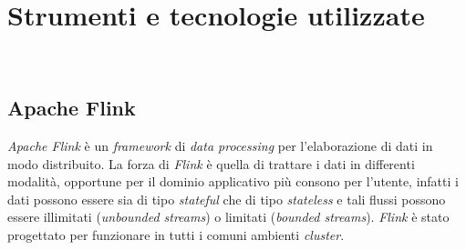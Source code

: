 
\chapter{Strumenti e tecnologie utilizzate}
\label{cap:strumenti-tecnologie}


\\

\section{Apache Flink}
\textit{Apache Flink} è un \textit{\textit{\gls{framework}}} di \textit{data processing} per l'elaborazione di dati in modo distribuito.
La forza di \textit{Flink} è quella di trattare i dati in differenti modalità, opportune per il dominio applicativo più consono per l'utente, infatti i dati possono essere sia di tipo \textit{\gls{stateful}} che di tipo \textit{\gls{stateless}} e tali flussi possono essere illimitati (\textit{\gls{unbounded streams}}) o limitati (\textit{\gls{bounded streams}}). \textit{Flink} è stato progettato per funzionare in tutti i comuni ambienti \textit{\gls{cluster}}.

